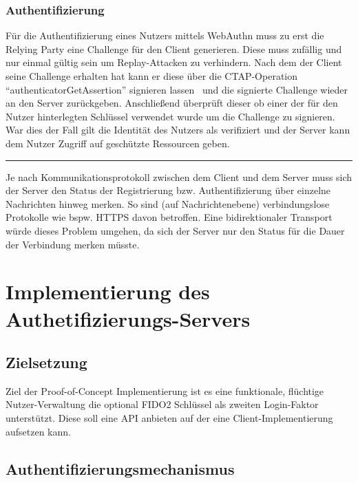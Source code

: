 \documentclass[journal]{IEEEtran}
\begin{document}
\subsubsection{Authentifizierung}

Für die Authentifizierung eines Nutzers mittels WebAuthn muss zu erst die
Relying Party eine Challenge für den Client generieren. Diese muss zufällig und
nur einmal gültig sein um Replay-Attacken zu verhindern. Nach dem der Client
seine Challenge erhalten hat kann er diese über die CTAP-Operation
``authenticatorGetAssertion'' signieren lassen~\cite{ctapspec} und die
signierte Challenge wieder an den Server zurückgeben. Anschließend überprüft
dieser ob einer der für den Nutzer hinterlegten Schlüssel verwendet wurde um
die Challenge zu signieren.~\cite{webauthnspec} War dies der Fall gilt die
Identität des Nutzers als verifiziert und der Server kann dem Nutzer Zugriff
auf geschützte Ressourcen geben.

\vspace{0.25em}
\rule{0.45\textwidth}{0.4pt}
\vspace{0.5em}

Je nach Kommunikationsprotokoll zwischen dem Client und dem Server muss sich
der Server den Status der Registrierung bzw. Authentifizierung über einzelne
Nachrichten hinweg merken. So sind (auf Nachrichtenebene) verbindungslose
Protokolle wie bspw. HTTPS davon betroffen. Eine bidirektionaler Transport
würde dieses Problem umgehen, da sich der Server nur den Status für die Dauer
der Verbindung merken müsste.

\section{Implementierung des Authetifizierungs-Servers}

\subsection{Zielsetzung}

Ziel der Proof-of-Concept Implementierung ist es eine funktionale,
flüchtige Nutzer-Verwaltung die optional FIDO2 Schlüssel als zweiten
Login-Faktor unterstützt. Diese soll eine API anbieten auf der eine
Client-Implementierung aufsetzen kann.

\subsection{Authentifizierungsmechanismus}
\end{document}
